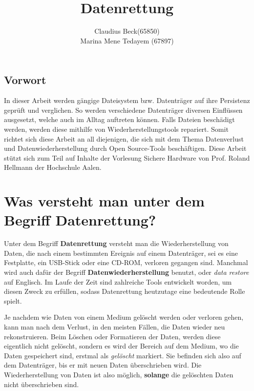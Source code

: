 \documentclass[10pt,a4paper]{article} %
\author{Claudius Beck(65850)\\ Marina Mene Tedayem (67897)}
\title{Datenrettung}
\begin{document}
\maketitle
\newpage
\tableofcontents
\newpage


\subsection*{Vorwort}

In dieser Arbeit werden gängige Dateisystem bzw. Datenträger auf ihre Persistenz geprüft und verglichen. So werden verschiedene Datenträger diversen Einflüssen ausgesetzt, welche auch im Alltag auftreten können. Falls Dateien beschädigt werden, werden diese mithilfe von Wiederherstellungstools \glqq repariert\grqq{}. Somit richtet sich diese Arbeit an all diejenigen, die sich mit dem Thema Datenverlust und Datenwiederherstellung durch Open Source-Tools beschäftigen. Diese Arbeit stützt sich zum Teil auf Inhalte der Vorlesung Sichere Hardware von Prof. Roland Hellmann der Hochschule Aalen.
\newpage


\section{Was versteht man unter dem Begriff Datenrettung?} %

Unter dem Begriff \textbf{Datenrettung} versteht man die Wiederherstellung von Daten, die nach einem bestimmten Ereignis auf einem Datenträger, sei es eine Festplatte, ein USB-Stick oder eine CD-ROM, verloren gegangen sind. Manchmal wird auch dafür der Begriff \textbf{Datenwiederherstellung} benutzt, oder \textit{data restore} auf Englisch. Im Laufe der Zeit sind zahlreiche Tools entwickelt worden, um diesen Zweck zu erfüllen, sodass Datenrettung heutzutage eine bedeutende Rolle spielt.\newline

Je nachdem wie Daten von einem Medium gelöscht werden oder verloren gehen, kann man nach dem Verlust, in den meisten Fällen, die Daten wieder neu rekonstruieren. Beim Löschen oder Formatieren der Daten, werden diese eigentlich nicht gelöscht, sondern es wird der Bereich auf dem Medium, wo die Daten gespeichert sind, erstmal als \textit{gelöscht} markiert. Sie befinden sich also auf dem Datenträger, bis er mit neuen Daten überschrieben wird. Die Wiederherstellung von Daten ist also möglich, \textbf{solange} die gelöschten Daten nicht überschrieben sind.
\end{document}
